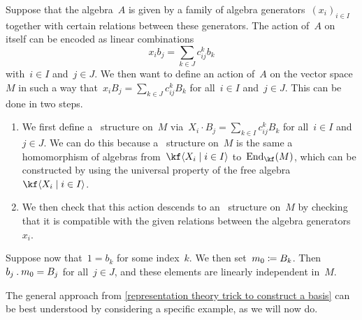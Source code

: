 \begin{construction}
	Suppose that the algebra~$A$ is given by a family of algebra generators~$(x_i)_{i \in I}$ together with certain relations between these generators.
	The action of~$A$ on itself can be encoded as linear combinations
	\[
		x_i b_j = \sum_{k \in J} c_{ij}^k b_k
	\]
	with~$i \in I$ and~$j \in J$.
	We then want to define an action of~$A$ on the vector space~$M$ in such a way that~$x_i B_j = \sum_{k \in J} c_{ij}^k B_k$ for all~$i \in I$ and~$j \in J$.
	This can be done in two steps.
	\begin{enumerate}
		\item
			We first define a~ structure on~$M$ via~$X_i \cdot B_j = \sum_{k \in I} c_{ij}^k B_k$ for all~$i \in I$ and~$j \in J$.
			We can do this because a~ structure on~$M$ is the same a homomorphism of algebras from~$\kf\gen{X_i \suchthat i \in I}$ to~$\End_{\kf}(M)$, which can be constructed by using the universal property of the free algebra~$\kf\gen{X_i \suchthat i \in I}$.
		\item
			We then check that this action descends to an~ structure on~$M$ by checking that it is compatible with the given relations between the algebra generators~$x_i$.
	\end{enumerate} 
	Suppose now that~$1 = b_k$ for some index~$k$.
	We then set~$m_0 \coloneqq B_k$.
	Then~$b_j \mathbin{.} m_0 = B_j$ for all~$j \in J$, and these elements are linearly independent in~$M$.
\end{construction}


\begin{fluff}
	The general approach from \cref{representation theory trick to construct a basis} can be best understood by considering a specific example, as we will now do.
\end{fluff}


